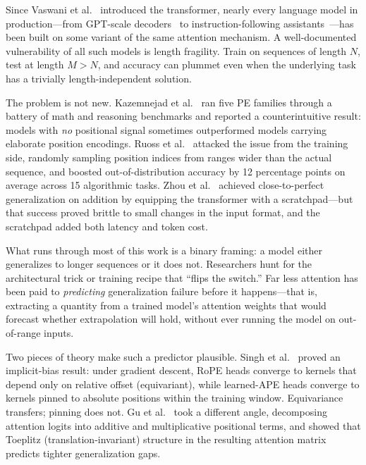 \documentclass[10pt,twocolumn]{article}
\begin{document}
Since Vaswani et al.~\cite{vaswani2017attention} introduced the transformer, nearly every language model in production---from GPT-scale decoders~\cite{brown2020language} to instruction-following assistants~\cite{touvron2023llama}---has been built on some variant of the same attention mechanism.
A well-documented vulnerability of all such models is length fragility.
Train on sequences of length $N$, test at length $M > N$, and accuracy can plummet even when the underlying task has a trivially length-independent solution.

The problem is not new.
Kazemnejad et al.~\cite{kazemnejad2023impact} ran five PE families through a battery of math and reasoning benchmarks and reported a counterintuitive result: models with \emph{no} positional signal sometimes outperformed models carrying elaborate position encodings.
Ruoss et al.~\cite{ruoss2023randomized} attacked the issue from the training side, randomly sampling position indices from ranges wider than the actual sequence, and boosted out-of-distribution accuracy by 12 percentage points on average across 15 algorithmic tasks.
Zhou et al.~\cite{zhou2024length} achieved close-to-perfect generalization on addition by equipping the transformer with a scratchpad---but that success proved brittle to small changes in the input format, and the scratchpad added both latency and token cost.

What runs through most of this work is a binary framing: a model either generalizes to longer sequences or it does not.
Researchers hunt for the architectural trick or training recipe that ``flips the switch.''
Far less attention has been paid to \emph{predicting} generalization failure before it happens---that is, extracting a quantity from a trained model's attention weights that would forecast whether extrapolation will hold, without ever running the model on out-of-range inputs.

Two pieces of theory make such a predictor plausible.
Singh et al.~\cite{singh2026relative} proved an implicit-bias result: under gradient descent, RoPE heads converge to kernels that depend only on relative offset (equivariant), while learned-APE heads converge to kernels pinned to absolute positions within the training window.
Equivariance transfers; pinning does not.
Gu et al.~\cite{gu2026deconstructing} took a different angle, decomposing attention logits into additive and multiplicative positional terms, and showed that Toeplitz (translation-invariant) structure in the resulting attention matrix predicts tighter generalization gaps.
\end{document}
